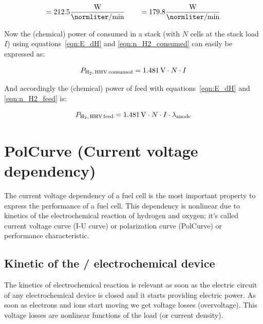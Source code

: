 \documentclass[11pt,a4paper,english,twoside]{scrreprt}
\begin{document}
\[ = 212.5\frac{\si{W}}{\si{\normliter\per\minute}}  \qquad = 179.8\frac{\si{W}}{\si{\normliter\per\minute}} \]



Now the (chemical) power of  consumed in a stack (with $N$ cells at the stack load $I$) using equations~\ref{eqn:E_dH} and \ref{eqn:n_H2_consumed} can easily be expressed as:

\begin{equation}
  \label{eqn:P_H2_consumed}
  P_{\ce{H2},\,\text{HHV\,consumed}} = \SI{1.481}{\volt} \cdot N \cdot I 
\end{equation}


And accordingly the (chemical) power of  feed with equations~\ref{eqn:E_dH} and \ref{eqn:n_H2_feed} is:

\begin{equation}
  \label{eqn:P_H2_feed}
  P_{\ce{H2},\,\text{HHV\,feed}} = \SI{1.481}{\volt} \cdot N \cdot I \cdot \lambda_{\text{anode}}
\end{equation}



\section{PolCurve (Current voltage dependency)}
\label{sec:polcurve}

The current voltage dependency of a fuel cell is the most important property to express the performance of a fuel cell. This dependency is nonlinear due to kinetics of the electrochemical reaction of hydrogen and oxygen; it's called current voltage curve (I-U curve) or polarization curve (PolCurve) or performance characteristic. 

\subsection{Kinetic of the / electrochemical device}

The kinetics of electrochemical reaction is relevant as soon as the electric circuit of any electrochemical device is closed and it starts providing electric power. As soon as electrons and ions start moving we get voltage losses (overvoltage). This voltage losses are nonlinear functions of the load (or current density).
\end{document}
